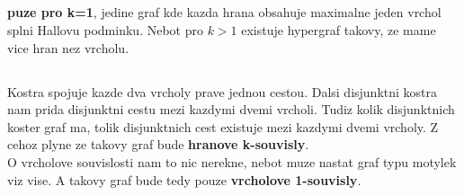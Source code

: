 \documentclass[a4paper]{article}
\begin{document}
\subsection{}
\textbf{puze pro k=1}, jedine graf kde kazda hrana obsahuje maximalne jeden
vrchol splni Hallovu podminku. Nebot pro $k>1$ existuje hypergraf takovy, ze
mame vice hran nez vrcholu.


\subsection{}
Kostra spojuje kazde dva vrcholy prave jednou cestou.
Dalsi disjunktni kostra nam prida disjunktni cestu mezi kazdymi dvemi vrcholi.
Tudiz kolik disjunktnich koster graf ma,
tolik disjunktnich cest existuje mezi kazdymi dvemi vrcholy.
Z cehoz plyne ze takovy graf bude \textbf{hranove k-souvisly}.
\\
O vrcholove souvislosti nam to nic nerekne, nebot muze nastat graf typu motylek
viz vise. A takovy graf bude tedy pouze \textbf{vrcholove 1-souvisly}.
\end{document}
